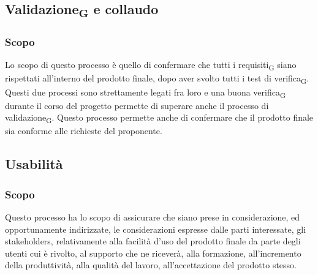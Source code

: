\subsection{Validazione\textsubscript{G} e collaudo}
\subsubsection{Scopo}
Lo scopo di questo processo è quello di confermare che tutti i requisiti\textsubscript{G} siano rispettati all'interno del prodotto finale, dopo aver svolto tutti i test di verifica\textsubscript{G}. Questi due processi sono strettamente legati fra loro e una buona verifica\textsubscript{G} durante il corso del progetto permette di superare anche il processo di validazione\textsubscript{G}.
Questo processo permette anche di confermare che il prodotto finale sia conforme alle richieste del proponente.

\subsection{Usabilità}
\subsubsection{Scopo}
Questo processo ha lo scopo di assicurare che siano prese in considerazione, ed  opportunamente indirizzate, le considerazioni espresse dalle parti interessate, gli stakeholders, relativamente alla facilità d'uso del prodotto finale da parte degli utenti cui è rivolto, al supporto che ne riceverà, alla formazione, all'incremento della produttività, alla qualità del lavoro, all'accettazione del prodotto stesso. 



